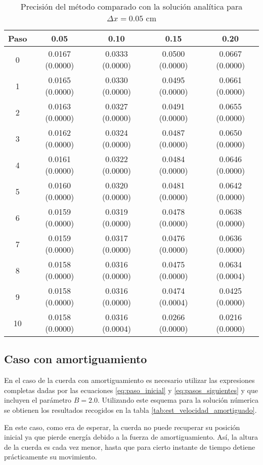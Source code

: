 \documentclass[11pt]{article}
\begin{document}
\begin{table}
\center
\begin{tabular}{ c c c c c }
\hline
Paso & 0.05 & 0.10 & 0.15 & 0.20 \\
\hline
\hline
0 & 0.0167 (0.0000) & 0.0333 (0.0000) & 0.0500 (0.0000) & 0.0667 (0.0000) \\
1 & 0.0165 (0.0000) & 0.0330 (0.0000) & 0.0495 (0.0000) & 0.0661 (0.0000) \\
2 & 0.0163 (0.0000) & 0.0327 (0.0000) & 0.0491 (0.0000) & 0.0655 (0.0000) \\
3 & 0.0162 (0.0000) & 0.0324 (0.0000) & 0.0487 (0.0000) & 0.0650 (0.0000) \\
4 & 0.0161 (0.0000) & 0.0322 (0.0000) & 0.0484 (0.0000) & 0.0646 (0.0000) \\
5 & 0.0160 (0.0000) & 0.0320 (0.0000) & 0.0481 (0.0000) & 0.0642 (0.0000) \\
6 & 0.0159 (0.0000) & 0.0319 (0.0000) & 0.0478 (0.0000) & 0.0638 (0.0000) \\
7 & 0.0159 (0.0000) & 0.0317 (0.0000) & 0.0476 (0.0000) & 0.0636 (0.0000) \\
8 & 0.0158 (0.0000) & 0.0316 (0.0000) & 0.0475 (0.0000) & 0.0634 (0.0004) \\
9 & 0.0158 (0.0000) & 0.0316 (0.0000) & 0.0474 (0.0004) & 0.0425 (0.0000) \\
10 & 0.0158 (0.0000) & 0.0316 (0.0004) & 0.0266 (0.0000) & 0.0216 (0.0000) \\
\end{tabular}
\caption{Precisión del método comparado con la solución analítica para $\Delta{x} = 0.05$ cm}
\label{tab:comparativa3}
\end{table}

\subsection{Caso con amortiguamiento}
En el caso de la cuerda con amortiguamiento es necesario utilizar las expresiones
completas dadas por las ecuaciones \eqref{eq:paso_inicial} y \eqref{eq:pasos_siguientes}
y que incluyen el parámetro $B = 2.0$.
Utilizando este esquema para la solución númerica se obtienen los resultados recogidos en
la tabla \ref{tab:est_velocidad_amortiguado}.

En este caso, como era de esperar, la cuerda no puede recuperar su posición inicial ya que
pierde energía debido a la fuerza de amortiguamiento. Así, la altura de la cuerda es 
cada vez menor, hasta que para cierto instante de tiempo detiene prácticamente su
movimiento.
\end{document}
